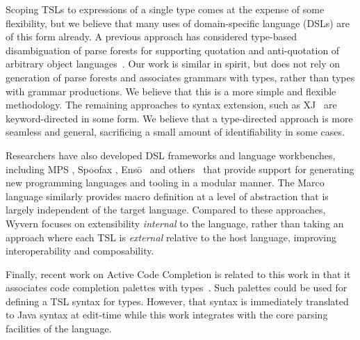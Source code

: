 Scoping TSLs to expressions of a single type comes at the expense of some flexibility, but we believe that many uses of domain-specific language (DSLs) are of this form already. A previous approach has considered type-based disambiguation of parse forests for supporting quotation and anti-quotation of arbitrary object languages~\cite{bravenboer2005generalized}. Our work is similar in spirit, but does not rely on generation of parse forests and associates grammars with types, rather than types with grammar productions. We believe that this is a more simple and flexible methodology. The remaining approaches to syntax extension, such as XJ~\cite{DBLP:conf/scam/ClarkSW08} are keyword-directed in some form. We believe that a type-directed approach is more seamless and general, sacrificing a small amount of identifiability in some cases.

Researchers have also developed DSL frameworks and language workbenches, including MPS \cite{mps}, Spoofax \cite{KatsVisser2010}, Ens\={o}~\cite{enso} and others~\cite{krahn2008monticore,van1992pregmatic} that provide support for generating new programming languages and tooling in a modular manner.  
The Marco language \cite{lee:2012:marco} similarly provides macro definition at a level of abstraction that is largely independent of the target language.
Compared to these approaches, Wyvern focuses on extensibility \emph{internal} to the language, rather than taking an approach where each TSL is \emph{external} relative to the host language, improving interoperability and composability.

Finally, recent work on Active Code Completion is related to this work in that it associates code completion palettes with types~\cite{omar2012active}. Such palettes could be used for defining a TSL syntax for types. However, that syntax is immediately translated to Java syntax at edit-time while this work integrates with the core parsing facilities of the language.



